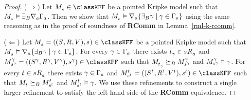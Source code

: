 \begin{proof}
($\Rightarrow$) Let $\kPModel{\kStateS} \in \classKFF$ be a pointed Kripke model such that $\kPModel{\kStateS} \entails \somerefsBs \coversA \Gamma_\agentA$.
Then we show that $\kPModel{\kStateS} \entails \coversA \{\somerefsBs \gamma \mid \gamma \in \Gamma_\agentA\}$ using the same reasoning as in the proof of soundness of {\bf RComm} in Lemma~\ref{rml-k-rcomm}.

($\Leftarrow$) Let $\kPModelAndTuple{\kStateS} \in \classKFF$ be a pointed Kripke model such that $\kPModel{\kStateS} \entails \coversA \{\somerefsBs \gamma \mid \gamma \in \Gamma_\agentA\}$.
For every $\gamma \in \Gamma_\agentA$ there exists $\kStateT_\gamma \in \kSuccessorsA{\kStateS}$ and $\kPModelAndTuple[\gamma]{\kStateS[\gamma]} \in \classKFF$ such that $\kPModel{\kStateT_\gamma} \simulatesBs \kPModel[\gamma]{\kStateS[\gamma]}$ and $\kPModel[\gamma]{\kStateS[\gamma]} \entails \gamma$.
For every $\kStateT \in \kSuccessorsA{\kStateS}$ there exists $\gamma \in \Gamma_\agentA$ and $\kPModelAndTuple[\kStateT]{\kStateS[\kStateT]} \in \classKFF$ such that $\kPModel{\kStateT} \simulatesBs \kPModel[\kStateT]{\kStateS[\kStateT]}$ and $\kPModel[\kStateT]{\kStateS[\kStateT]} \entails \gamma$.
We use these refinements to construct a single larger refinement to satisfy the left-hand-side of the {\bf RComm} equivalence.


\end{proof}
